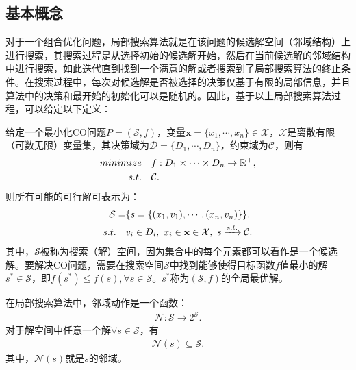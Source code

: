 \subsection{基本概念}
\label{subsec:背景介绍:局部搜索:基本概念}
对于一个组合优化问题，局部搜索算法就是在该问题的候选解空间（邻域结构）上进行搜索，其搜索过程是从选择初始的候选解开始，然后在当前候选解的邻域结构中进行搜索，如此迭代直到找到一个满意的解或者搜索到了局部搜索算法的终止条件。在搜索过程中，每次对候选解是否被选择的决策仅基于有限的局部信息，并且算法中的决策和最开始的初始化可以是随机的。因此，基于以上局部搜索算法过程，可以给定以下定义\cite{blum2003metaheuristics}：
\begin{definition}
    \label{def:CO}
    给定一个最小化CO问题$P = (\mathcal{S}, f)$，变量$\mathbf{x}=\{ x_1, \cdots, x_n \} \in \mathcal{X}$，$\mathcal{X}$是离散有限（可数无限）变量集，其决策域为$\mathcal{D} = \{ D_1, \cdots, D_n \}$，约束域为$\mathcal{C}$，则有
    \begin{align}
        \label{eq:CO}
        minimize \quad & f: D_1 \times \cdots \times D_n \rightarrow \mathbb{R}^+, \\
        s.t. \quad & \mathcal{C}. \notag
    \end{align}
    则所有可能的可行解可表示为：
    \begin{align}
        \label{eq:可行解}
       \mathcal{S} = & \{ s = \{ (x_1, v_1), \cdots, (x_n, v_n) \} \}, \\
        s.t. \quad & v_i \in D_i, \ x_i \in \mathbf{x} \in \mathcal{X}, \ s \xrightarrow[]{s.t.} \mathcal{C}. \notag
    \end{align}
    其中，$\mathcal{S}$被称为搜索（解）空间，因为集合中的每个元素都可以看作是一个候选解。要解决CO问题，需要在搜索空间$\mathcal{S}$中找到能够使得目标函数$f$值最小的解$s^* \in \mathcal{S}$，即$f(s^*) \leq f(s), \forall s \in \mathcal{S}$。$s^*$称为$(\mathcal{S}, f)$的全局最优解。
\end{definition}
\par
\begin{definition}
    \label{def:邻域动作和邻域}
    在局部搜索算法中，邻域动作是一个函数：
    \begin{align}
        \label{eq:邻域动作}
        \mathcal{N}:\mathcal{S} \rightarrow 2^{\mathcal{S}}.
    \end{align}
    对于解空间中任意一个解$\forall s \in \mathcal{S}$，有
    \begin{align}
        \label{eq:邻域}
        \mathcal{N}(s) \subseteq \mathcal{S}.
    \end{align}
    其中，$\mathcal{N}(s)$就是$s$的邻域。
\end{definition}
